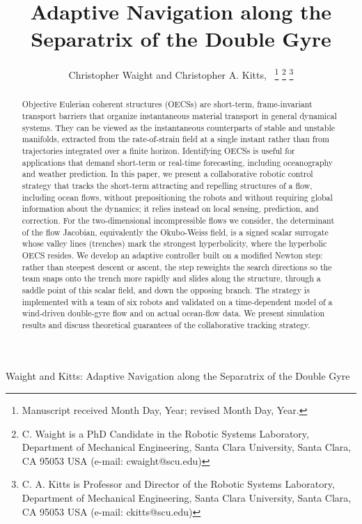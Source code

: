 \documentclass[lettersize,journal]{IEEEtran}
\begin{document}
\title{Adaptive Navigation along the Separatrix of the Double Gyre}

\author{Christopher Waight and Christopher A. Kitts,~
\thanks{Manuscript received Month Day, Year; revised Month Day, Year.}
\thanks{C. Waight is a PhD Candidate in the Robotic Systems Laboratory, Department of Mechanical
Engineering, Santa Clara University, Santa Clara, CA 95053 USA (e-mail: cwaight@scu.edu)}
\thanks{C. A. Kitts is Professor and Director of the Robotic Systems Laboratory, Department of
Mechanical Engineering, Santa Clara University, Santa Clara, CA 95053 USA (e-mail: ckitts@scu.edu)}
}
%
{Waight and Kitts: Adaptive Navigation along the Separatrix of the Double Gyre}

\maketitle

\begin{abstract}
Objective Eulerian coherent structures (OECSs) are short-term,
frame-invariant transport barriers that organize instantaneous material
transport in general dynamical systems. They can be viewed as the
instantaneous counterparts of stable and unstable manifolds, extracted
from the rate-of-strain field at a single instant rather than from
trajectories integrated over a finite horizon. Identifying OECSs is
useful for applications that demand short-term or real-time forecasting,
including oceanography and weather prediction. In this paper, we present
a collaborative robotic control strategy that tracks the short-term
attracting and repelling structures of a flow, including ocean flows,
without prepositioning the robots and without requiring global
information about the dynamics; it relies instead on local sensing,
prediction, and correction. For the two-dimensional incompressible flows
we consider, the determinant of the flow Jacobian, equivalently the
Okubo-Weiss field, is a signed scalar surrogate whose valley lines
(trenches) mark the strongest hyperbolicity, where the hyperbolic OECS
resides. We develop an adaptive controller built on a modified Newton
step: rather than steepest descent or ascent, the step reweights the
search directions so the team snaps onto the trench more rapidly and
slides along the structure, through a saddle point of this scalar
field, and down the opposing branch. The strategy is implemented with a
team of six robots and validated on a time-dependent model of a
wind-driven double-gyre flow and on actual ocean-flow data. We present
simulation results and discuss theoretical guarantees of the
collaborative tracking strategy.
\end{abstract}
\end{document}

